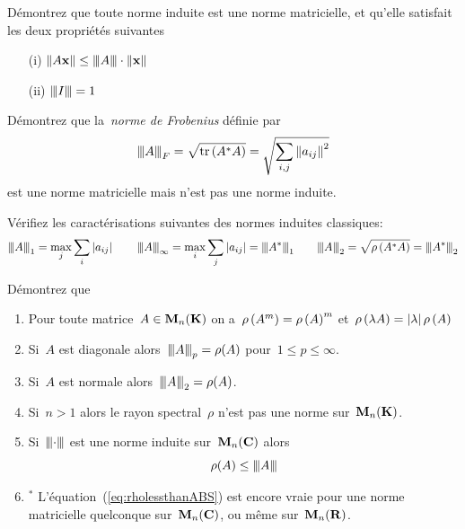 \begin{exercice}
	Démontrez que toute norme induite est une norme matricielle, et qu'elle
	satisfait les deux propriétés suivantes
	\begin{enumerate}
		\item[(i)] $\Abs{A\x}\le\ABS A\cdot\Abs\x$
		\item[(ii)] $\ABS I = 1$
	\end{enumerate}
\end{exercice}

\begin{exercice}
	Démontrez que la~\emph{norme de Frobenius} définie par
	\[
		\ABS A_F
		=
		\sqrt{\mathrm{tr}\parens{A^*A}}
		=
		\sqrt{\sum_{i,j}\Abs{a_{ij}}^2}
	\]
	est une norme matricielle mais n'est pas une norme induite.
\end{exercice}


\begin{exercice}
	Vérifiez les caractérisations suivantes des normes induites classiques:
	\[
		\ABS A_1      = \max_j\sum_i\abs{a_{ij}}
		\qquad
		\ABS A_\infty = \max_i\sum_j\abs{a_{ij}} = \ABS{A^*}_1
		\qquad
		\ABS A_2      = \sqrt{\rho\parens{A^*A}} = \ABS{A^*}_2
	\]
\end{exercice}


\begin{exercice}
	Démontrez que %
	\begin{enumerate}
		\item Pour toute matrice~$A\in\M_n(\K)$ on
			a~$\rho\parens{A^m}=\rho\parens{A}^m$ et~$\rho\parens{\lambda
			A}=\abs\lambda\rho\parens{A}$
		\item Si~$A$ est diagonale alors~$\ABS A_p=\rho(A)$
			pour~$1\le p\le\infty$.
		\item Si~$A$ est normale alors~$\ABS A_2=\rho(A)$.
		\item Si~$n>1$ alors le rayon spectral~$\rho$ n'est pas une norme
			sur~$\M_n(\K)$.
		\item Si~$\ABS\cdot$ est une norme induite sur~$\M_n(\C)$ alors
			\begin{equation}\label{eq:rholessthanABS}
				\rho(A)\le\ABS A
			\end{equation}
		\item${}^*$ L'équation~(\ref{eq:rholessthanABS}) est encore vraie pour
			une norme matricielle quelconque sur~$\M_n(\C)$, ou même
			sur~$\M_n(\R)$.
	\end{enumerate}
\end{exercice}

